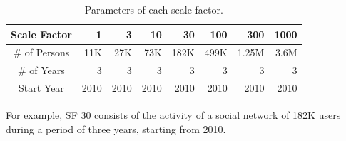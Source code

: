 \begin{table}[H]
\centering
\begin{tabular}{|c||r|r|r|r|r|r|r|}
\hline  Scale Factor  & 1 &  3 & 10 & 30 & 100 & 300 & 1000 \\
\hline  \# of Persons  & 11K &  27K & 73K & 182K & 499K & 1.25M & 3.6M \\
\hline  \# of Years  & 3 &  3 & 3 & 3 & 3 & 3 & 3 \\
\hline  Start Year & 2010 &  2010 & 2010 & 2010 & 2010 & 2010 & 2010 \\
\hline
\end{tabular}
\centering
\caption{Parameters of each scale factor.}
\label{tab:snsize}
\end{table}

For example, SF 30 consists of the activity of a social network of 182K users
during a period of three years, starting from 2010.

